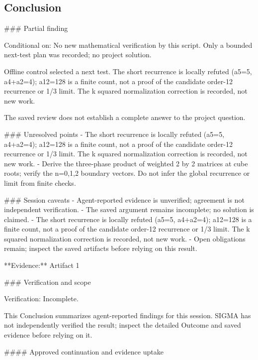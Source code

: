 \documentclass[11pt]{article}
\begin{document}
\subsection{Conclusion}
\#\#\# Partial finding

Conditional on: No new mathematical verification by this script. Only a bounded next-test plan was recorded; no project solution.

Offline control selected a next test. The short recurrence is locally refuted (a5=5, a4+a2=4); a12=128 is a finite count, not a proof of the candidate order-12 recurrence or 1/3 limit. The k squared normalization correction is recorded, not new work.

The saved review does not establish a complete answer to the project question.

\#\#\# Unresolved points
- The short recurrence is locally refuted (a5=5, a4+a2=4); a12=128 is a finite count, not a proof of the candidate order-12 recurrence or 1/3 limit. The k squared normalization correction is recorded, not new work.
- Derive the three-phase product of weighted 2 by 2 matrices at cube roots; verify the n=0,1,2 boundary vectors. Do not infer the global recurrence or limit from finite checks.

\#\#\# Session caveats
- Agent-reported evidence is unverified; agreement is not independent verification.
- The saved argument remains incomplete; no solution is claimed.
- The short recurrence is locally refuted (a5=5, a4+a2=4); a12=128 is a finite count, not a proof of the candidate order-12 recurrence or 1/3 limit. The k squared normalization correction is recorded, not new work.
- Open obligations remain; inspect the saved artifacts before relying on this result.

**Evidence:** Artifact 1

\#\#\# Verification and scope

Verification: Incomplete.

This Conclusion summarizes agent-reported findings for this session. SIGMA has not independently verified the result; inspect the detailed Outcome and saved evidence before relying on it.

\#\#\#\# Approved continuation and evidence uptake
\end{document}
